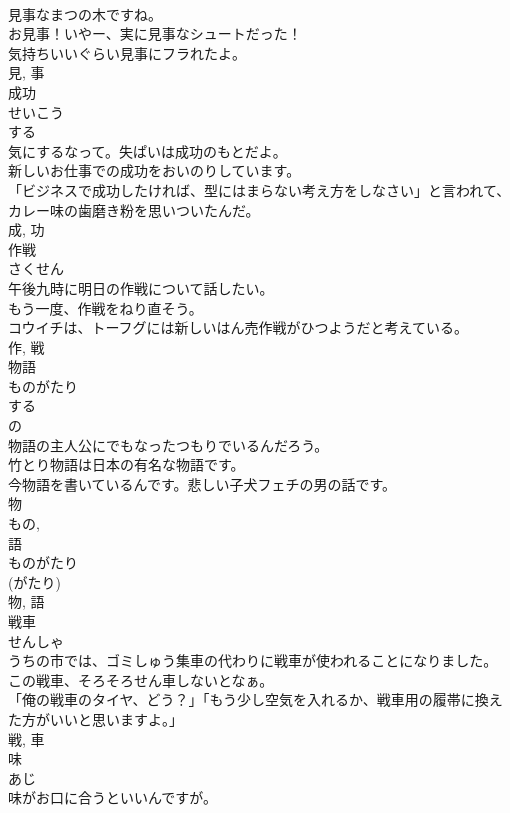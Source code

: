 \documentclass[8pt]{extreport}
\begin{document}
\begin{CJK}{UTF8}{min}
\\	見事なまつの木ですね。	
\\	お見事！いやー、実に見事なシュートだった！	
\\	気持ちいいぐらい見事にフラれたよ。	
\\	見, 事	
\\	成功	
\\	せいこう	
\\	する 
\\	気にするなって。失ぱいは成功のもとだよ。	
\\	新しいお仕事での成功をおいのりしています。	
\\	「ビジネスで成功したければ、型にはまらない考え方をしなさい」と言われて、カレー味の歯磨き粉を思いついたんだ。	
\\	成, 功	
\\	作戦	
\\	さくせん	
\\	午後九時に明日の作戦について話したい。	
\\	もう一度、作戦をねり直そう。	
\\	コウイチは、トーフグには新しいはん売作戦がひつようだと考えている。	
\\	作, 戦	
\\	物語	
\\	ものがたり	
\\	する 
\\	の 
\\	物語の主人公にでもなったつもりでいるんだろう。	
\\	竹とり物語は日本の有名な物語です。	
\\	今物語を書いているんです。悲しい子犬フェチの男の話です。	
\\	物 
\\	もの, 
\\	語 
\\	ものがたり 
\\	(がたり) 
\\	物, 語	
\\	戦車	
\\	せんしゃ	
\\	うちの市では、ゴミしゅう集車の代わりに戦車が使われることになりました。	
\\	この戦車、そろそろせん車しないとなぁ。	
\\	「俺の戦車のタイヤ、どう？」「もう少し空気を入れるか、戦車用の履帯に換えた方がいいと思いますよ。」	
\\	戦, 車	
\\	味	
\\	あじ	
\\	味がお口に合うといいんですが。	

\end{CJK}
\end{document}
